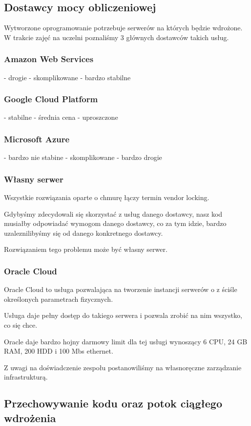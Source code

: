 \subsection{Dostawcy mocy obliczeniowej}
\label{subsec:dostawcy-mocy-obliczeniowej}
Wytworzone oprogramowanie potrzebuje serwerów na których będzie wdrożone.
W trakcie zajęć na uczelni poznaliśmy 3 głównych dostawców takich usług.

\subsubsection{Amazon Web Services}
- drogie
- skomplikowane
- bardzo stabilne
\subsubsection{Google Cloud Platform}
- stabilne
- średnia cena
- uproszczone
\subsubsection{Microsoft Azure}
- bardzo nie stabine
- skomplikowane
- bardzo drogie

\subsubsection{Własny serwer}
Wszystkie rozwiązania oparte o chmurę łączy termin vendor locking.

Gdybyśmy zdecydowali się skorzystać z usług danego dostawcy, nasz kod musiałby odpowiadać wymogom danego dostawcy, co za tym idzie, bardzo uzaleznilibyśmy się od danego konkretnego dostawcy.

Rozwiązaniem tego problemu może być własny serwer.
\subsubsection{Oracle Cloud}
Oracle Cloud to usługa pozwalająca na tworzenie instancji  serwerów o z ściśle określonych parametrach fizycznych.

Usługa daje pełny dostęp do takiego serwera i pozwala zrobić na nim wszystko, co się chce.

Oracle daje bardzo hojny darmowy limit dla tej usługi wynoszący 6 CPU, 24 GB RAM, 200 HDD i 100 Mbs ethernet.

Z uwagi na doświadczenie zespołu postanowiliśmy na własnoręczne zarządzanie infrastrukturą.

\subsection{Przechowywanie kodu oraz potok ciągłego wdrożenia}
\label{subsec:przechowywanie-kodu-oraz-potok-ciagego-wdrozenia}
